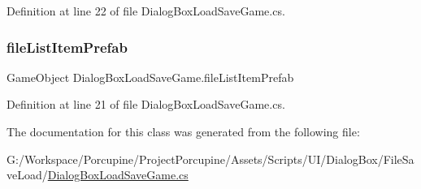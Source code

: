 Definition at line 22 of file Dialog\+Box\+Load\+Save\+Game.\+cs.

\mbox{\label{class_dialog_box_load_save_game_afd6eca777433df1fe27ced67205d745f}} 
\subsubsection{\texorpdfstring{file\+List\+Item\+Prefab}{fileListItemPrefab}}
{\footnotesize\ttfamily Game\+Object Dialog\+Box\+Load\+Save\+Game.\+file\+List\+Item\+Prefab}



Definition at line 21 of file Dialog\+Box\+Load\+Save\+Game.\+cs.



The documentation for this class was generated from the following file\+:\begin{DoxyCompactItemize}
\item 
G\+:/\+Workspace/\+Porcupine/\+Project\+Porcupine/\+Assets/\+Scripts/\+U\+I/\+Dialog\+Box/\+File\+Save\+Load/\hyperlink{_dialog_box_load_save_game_8cs}{Dialog\+Box\+Load\+Save\+Game.\+cs}\end{DoxyCompactItemize}
